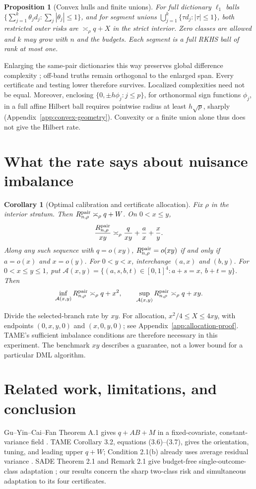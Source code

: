 \documentclass{article}
\newtheorem{proposition}[theorem]{Proposition}
\newtheorem{corollary}[theorem]{Corollary}
\theoremstyle{definition}
\theoremstyle{remark}
\begin{document}
\begin{proposition}[Convex hulls and finite unions]
\label{prop:convex-geometry}
For full dictionary \(\ell_1\) balls
\(\{\sum_{j=1}^k\theta_jd_j:\sum_j|\theta_j|\le1\}\), and for segment
unions \(\bigcup_{j=1}^k\{\tau d_j:|\tau|\le1\}\), both restricted
outer risks are \(\asymp_\rho q+X\) in the strict interior.
Zero classes are allowed and \(k\) may grow with \(n\) and the budgets.
Each segment is a full RKHS ball of rank at most one.
\end{proposition}
Enlarging the same-pair dictionaries this way preserves global difference
complexity \citep[Theorem 12(2)]{bartlett2002rademacher}; off-band truths
remain orthogonal to the enlarged span. Every certificate and testing
lower therefore survives. Localized complexities need not be equal.
Moreover, enclosing \(\{0,\pm h\phi_j:j\le p\}\), for orthonormal sign
functions \(\phi_j\), in a full affine Hilbert ball requires pointwise radius at least
\(h\sqrt p\), sharply (Appendix~\ref{app:convex-geometry}).
Convexity or a finite union alone thus does not give the Hilbert rate.

\section{What the rate says about nuisance imbalance}
\label{sec:interpretation}
\label{sec:mechanisms}
\begin{corollary}[Optimal calibration and certificate allocation]
\label{cor:allocation}
Fix \(\rho\) in the interior stratum. Then \(R^{\mathrm{pair}}_{n,\rho}\asymp_\rho q+W\). On \(0<x\le y\),
\[
 \frac{R^{\mathrm{pair}}_{n,\rho}}{xy}\asymp_\rho\frac{q}{xy}+\frac ax+\frac xy.
\]
Along any such sequence with \(q=o(xy)\), \(R^{\mathrm{pair}}_{n,\rho}=o(xy)\) if and only if \(a=o(x)\) and \(x=o(y)\). For \(0<y<x\), interchange \((a,x)\) and \((b,y)\).
For \(0<x\le y\le1\), put
\(\mathcal A(x,y)=\{(a,s,b,t)\in[0,1]^4:a+s=x,\ b+t=y\}\). Then
\[
 \inf_{\mathcal A(x,y)}R^{\mathrm{pair}}_{n,\rho}\asymp_\rho q+x^2,
 \qquad \sup_{\mathcal A(x,y)}R^{\mathrm{pair}}_{n,\rho}\asymp_\rho q+xy.
\]
\end{corollary}
Divide the selected-branch rate by \(xy\). For allocation,
\(x^2/4\le X\le4xy\), with endpoints \((0,x,y,0)\) and \((x,0,y,0)\);
see Appendix~\ref{app:allocation-proof}. TAME's sufficient imbalance
conditions are therefore necessary in this experiment. The benchmark
\(xy\) describes a guarantee, not a lower bound for a particular DML algorithm.

\section{Related work, limitations, and conclusion}
\label{sec:related}
Gu--Yin--Cai--Fan Theorem A.1 gives \(q+AB+M\) in a fixed-covariate, constant-variance field \citep{gu2026tamingbiases}. TAME Corollary 3.2, equations (3.6)--(3.7), gives the orientation, tuning, and leading upper \(q+W\); Condition 2.1(b) already uses average residual variance \citep{gu2026optimalblackbox}. SADE Theorem 2.1 and Remark 2.1 give budget-free single-outcome-class adaptation \citep{gu2026tamingbiases}; our results concern the sharp two-class risk and simultaneous adaptation to its four certificates.
\end{document}
